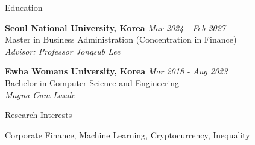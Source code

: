 \documentclass{resume} %
\begin{document}

\begin{rSection}{Education}

{\bf Seoul National University, Korea} \hfill {\em Mar 2024 - Feb 2027} 
\\{ Master in Business Administration (Concentration in Finance)} \hfill
\\ { \textit{Advisor: Professor Jongsub Lee}} 

{\bf Ewha Womans University, Korea} \hfill {\em Mar 2018 - Aug 2023} 
\\ {Bachelor in Computer Science and Engineering}
\\ { \textit{Magna Cum Laude}} 

\end{rSection}


\begin{rSection}{Research Interests}

    Corporate Finance, Machine Learning, Cryptocurrency, Inequality

\end{rSection}


\end{document}
